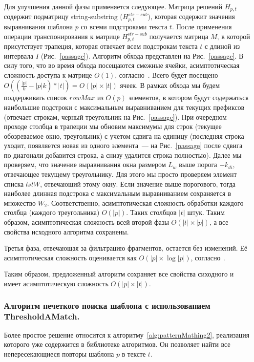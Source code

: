 Для улучшения данной фазы применяется следующее.
Матрица решений $H_{p,t}$ содержит подматрицу string-substring ($H^{str-sub}_{p,t}$), которая содержит значения выравнивания шаблона $p$ со всеми подстроками текста $t$.
После применения операции транспонирования к матрице $H^{str-sub}_{p,t}$ получается матрица $M$, в которой присутствует трапеция, которая отвечает всем подстрокам текста $t$ с длиной из интервала $I$ (Рис.~\ref{passage}).
Алгоритм обхода представлен на Рис.~\ref{passage}.
В силу того, что во время обхода посещаются смежные ячейки, асимптотическая сложность доступа к матрице $O(1)$, согласно~\cite{tiskin2008semi}.
Всего будет посещено $O((\frac{|p|}{k}-|p|k)*|t|)=O(|p|\times|t|)$ ячеек.
В рамках обхода мы будем поддерживать список $rowMax$ из $O(p)$ элементов, в котором будут содержаться наибольшие подстроки с максимальным выравниванием для текущих префиксов (отвечает строкам, черный треугольник на Рис.~\ref{passage}).
При очередном проходе столбца в трапеции мы обновим максимумы для строк (текущее обозреваемое окно, треугольник) с учетом сдвига на единицу (последняя строка уходит, появляется новая из одного элемента~--- на Рис.~\ref{passage} после сдвига по диагонали добавится строка, а снизу удалится строка полностью).
Далее мы проверяем, что значение выравнивания окна размером $L_{w}$ выше порога $-k_{di}$, отвечающее текущему треугольнику.
Для этого мы просто проверяем элемент списка $lstW$, отвечающий этому окну.
Если значение выше порогового, тогда наиболее длинная подстрока с максимальным выравниванием сохраняется в множество $W_{2}$.
Соответственно, асимптотическая сложность обработки каждого столбца (каждого треугольника) $O(|p|)$.
Таких столбцов $|t|$ штук.
Таким образом, асимптотическая сложность всей второй фазы $O(|t| \times |p|)$, а все свойства исходного алгоритма сохранены.

Третья фаза, отвечающая за фильтрацию фрагментов, остается без изменений.
Её асимптотическая сложность оценивается как $O(|p| \times \log |p|)$, согласно~\cite{luciv2019interactive}.

Таким образом, предложенный алгоритм сохраняет все свойства сиходного и имеет асимптотическую сложность $O(|p| \times |t|)$.


\subsubsection{Алгоритм нечеткого поиска шаблона с использованием ThresholdAMatch.}
Более простое решение  относится к алгоритму~\ref{alg:patternMathing2}, реализация которого уже содержится в библиотеке алгоритмов. 
Он позволяет найти все непересекающиеся повторы шаблона $p$ в тексте $t$.

